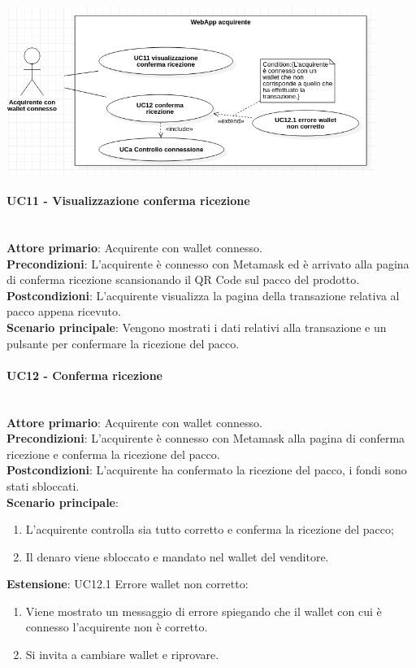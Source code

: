 \documentclass[a4paper, 12pt]{article}
\begin{document}
\includegraphics[width=0.9\textwidth]{UC_WAA2}

\paragraph{UC11 - Visualizzazione conferma ricezione}\\
\textbf{Attore primario}: Acquirente con wallet connesso.\\
\textbf{Precondizioni}: L'acquirente è connesso con Metamask ed è arrivato alla pagina di conferma ricezione scansionando il QR Code sul pacco del prodotto.\\
\textbf{Postcondizioni}: L'acquirente visualizza la pagina della transazione relativa al pacco appena ricevuto.\\
\textbf{Scenario principale}:
Vengono mostrati i dati relativi alla transazione e un pulsante per confermare la ricezione del pacco.

\paragraph{UC12 - Conferma ricezione}\\
\textbf{Attore primario}: Acquirente con wallet connesso.\\
\textbf{Precondizioni}: L'acquirente è connesso con Metamask alla pagina di conferma ricezione e conferma la ricezione del pacco.\\
\textbf{Postcondizioni}: L'acquirente ha confermato la ricezione del pacco, i fondi sono stati sbloccati.\\
\textbf{Scenario principale}:
\begin{enumerate}
    \item L'acquirente controlla sia tutto corretto e conferma la ricezione del pacco;
    \item Il denaro viene sbloccato e mandato nel wallet del venditore.
\end{enumerate}
\textbf{Estensione}:
UC12.1 Errore wallet non corretto:
\begin{enumerate}
    \item Viene mostrato un messaggio di errore spiegando che il wallet con cui è connesso l'acquirente non è corretto.
    \item Si invita a cambiare wallet e riprovare.
\end{enumerate}
\end{document}
